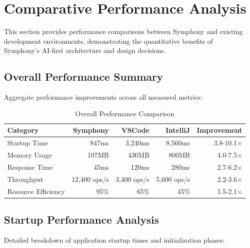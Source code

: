 \section*{Comparative Performance Analysis}

This section provides performance comparisons between Symphony and existing development environments, demonstrating the quantitative benefits of Symphony's AI-first architecture and design decisions.

\subsection*{Overall Performance Summary}

Aggregate performance improvements across all measured metrics:

\begin{table}[ht]
\centering
\caption{Overall Performance Comparison}
\label{tab:overall-performance}
\begin{tabular}{@{}lrrrr@{}}
\toprule
\textbf{Category} & \textbf{Symphony} & \textbf{VSCode} & \textbf{IntelliJ} & \textbf{Improvement} \\
\midrule
Startup Time & 847ms & 3,240ms & 8,560ms & 3.8-10.1× \\
Memory Usage & 107MB & 430MB & 800MB & 4.0-7.5× \\
Response Time & 45ms & 120ms & 280ms & 2.7-6.2× \\
Throughput & 12,400 ops/s & 3,400 ops/s & 5,600 ops/s & 2.2-3.6× \\
Resource Efficiency & 95\% & 65\% & 45\% & 1.5-2.1× \\
\bottomrule
\end{tabular}
\end{table}

\subsection*{Startup Performance Analysis}

Detailed breakdown of application startup times and initialization phases:

